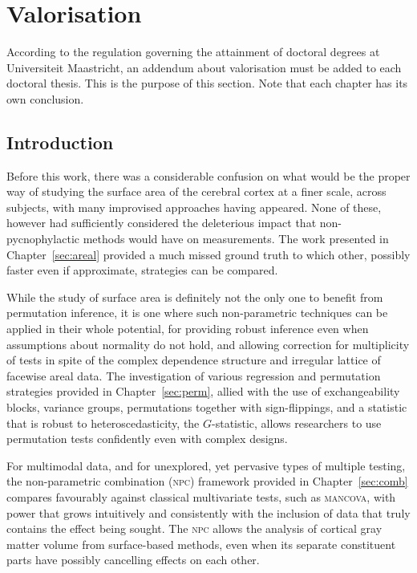 \chapter{Valorisation}
\label{sec:valor}
\setstretch{\lspac}

According to the regulation governing the attainment of doctoral degrees at Uni\-versi\-teit Maas\-tricht, an addendum about valorisation must be added to each doctoral thesis. This is the purpose of this section. Note that each chapter has its own conclusion.

\section{Introduction}

Before this work, there was a considerable confusion on what would be the proper way of studying the surface area of the cerebral cortex at a finer scale, across subjects, with many improvised approaches having appeared. None of these, however had sufficiently considered the deleterious impact that non-pycnophylactic methods would have on measurements. The work presented in Chapter~\ref{sec:areal} provided a much missed ground truth to which other, possibly faster even if approximate, strategies can be compared.

While the study of surface area is definitely not the only one to benefit from permutation inference, it is one where such non-parametric techniques can be applied in their whole potential, for providing robust inference even when assumptions about normality do not hold, and allowing correction for multiplicity of tests in spite of the complex dependence structure and irregular lattice of facewise areal data. The investigation of various regression and permutation strategies provided in Chapter~\ref{sec:perm}, allied with the use of exchangeability blocks, variance groups, permutations together with sign-flippings, and a statistic that is robust to heteroscedasticity, the $G$-statistic, allows researchers to use permutation tests confidently even with complex designs.

For multimodal data, and for unexplored, yet pervasive types of multiple testing, the non-parametric combination (\textsc{npc}) framework provided in Chapter~\ref{sec:comb} compares favourably against classical multivariate tests, such as \textsc{mancova}, with power that grows intuitively and consistently with the inclusion of data that truly contains the effect being sought. The \textsc{npc} allows the analysis of cortical gray matter volume from surface-based methods, even when its separate constituent parts have possibly cancelling effects on each other.

